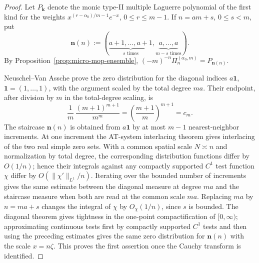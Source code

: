 \documentclass[reqno]{article}
\theoremstyle{definition}
\theoremstyle{remark}
\theoremstyle{plain}
\begin{document}
\begin{proof}
Let $P_{\boldsymbol k}$ denote the monic type-II multiple Laguerre polynomial of the first kind for the weights $x^{(r-\alpha_0)/m-1}e^{-x}$, $0\le r\le m-1$. If $n=am+s$, $0\le s<m$, put
$$\boldsymbol n(n):=(\underbrace{a+1,\dots,a+1}_{s\text{ times}},\underbrace{a,\dots,a}_{m-s\text{ times}}).$$
By Proposition~\ref{prop:micro-mop-ensemble}, $(-m)^{-n}\Pi_n^{(\alpha_0,m)}=P_{\boldsymbol n(n)}$.

Neuschel--Van Assche prove the zero distribution for the diagonal indices $a\mathbf 1$, $\mathbf 1=(1,\ldots,1)$, with the argument scaled by the total degree $ma$. Their endpoint, after division by $m$ in the total-degree scaling, is
\[
\frac1m\,\frac{(m+1)^{m+1}}{m^m}
=\left(\frac{m+1}{m}\right)^{m+1}=c_m.
\]
The staircase $\boldsymbol n(n)$ is obtained from $a\mathbf 1$ by at most $m-1$ nearest-neighbor increments. At one increment the AT-system interlacing theorem gives interlacing of the two real simple zero sets. With a common spatial scale $N\asymp n$ and normalization by total degree, the corresponding distribution functions differ by $O(1/n)$; hence their integrals against any compactly supported $C^1$ test function $\chi$ differ by $O(\|\chi'\|_{L^1}/n)$. Iterating over the bounded number of increments gives the same estimate between the diagonal measure at degree $ma$ and the staircase measure when both are read at the common scale $ma$. Replacing $ma$ by $n=ma+s$ changes the integral of $\chi$ by $O_\chi(1/n)$, since $s$ is bounded. The diagonal theorem gives tightness in the one-point compactification of $[0,\infty)$; approximating continuous tests first by compactly supported $C^1$ tests and then using the preceding estimates gives the same zero distribution for $\boldsymbol n(n)$ with the scale $x=n\zeta$. This proves the first assertion once the Cauchy transform is identified.


\end{proof}
\end{document}
